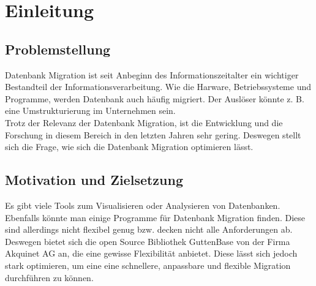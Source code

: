 \chapter{Einleitung}


\section{Problemstellung}


Datenbank Migration ist seit Anbeginn des Informationszeitalter ein wichtiger Bestandteil der Informationsverarbeitung. Wie die Harware, Betriebssysteme und Programme, werden Datenbank auch häufig migriert. Der Auslöser könnte z. B. eine Umstrukturierung im Unternehmen sein. \\
Trotz der Relevanz der Datenbank Migration, ist die Entwicklung und die Forschung in diesem Bereich in den letzten Jahren sehr gering. Deswegen stellt sich die Frage, wie sich die Datenbank Migration optimieren lässt.\\

\section{Motivation und Zielsetzung}
Es gibt viele Tools zum Visualisieren oder Analysieren von  Datenbanken. Ebenfalls könnte man einige Programme für Datenbank Migration finden. Diese sind allerdings nicht flexibel genug bzw. decken nicht alle Anforderungen ab. Deswegen bietet sich die open Source Bibliothek GuttenBase von der Firma Akquinet AG an, die eine gewisse Flexibilität anbietet. Diese lässt sich jedoch stark optimieren, um eine eine schnellere, anpassbare und flexible Migration durchführen zu können.\\




